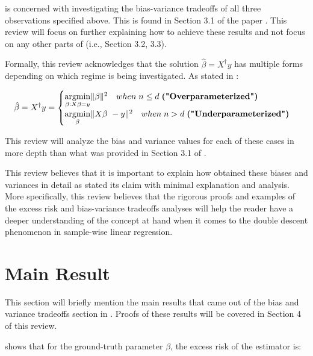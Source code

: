 \documentclass{article}
\begin{document}
\cite{Nakkiran_2019} is concerned with investigating the bias-variance tradeoffs of all three observations specified above. This is found in Section 3.1 of the paper \cite{Nakkiran_2019}. This review will focus on further explaining how to achieve these results and not focus on any other parts of \cite{Nakkiran_2019} (i.e., Section 3.2, 3.3).

Formally, this review acknowledges that the solution $\hat{\beta} = X^{\dagger}y$ has multiple forms depending on which regime is being investigated. As stated in \cite{Nakkiran_2019}:

\begin{equation*}
\hat{\beta} = X^{\dagger}y =\begin{cases}
          \underset{\beta : X\beta = y}{\mathrm{argmin}} \|\beta\|^2 \quad when \hspace{1mm} n\leq d \hspace{1mm} \textbf{("Overparameterized")}\\
          \underset{\beta}{\mathrm{argmin}} \|X\beta\ - y\|^2 \quad when \hspace{1mm} n>d \hspace{1mm} \textbf{("Underparameterized")}
     \end{cases}
\end{equation*}

This review will analyze the bias and variance values for each of these cases in more depth than what was provided in Section 3.1 of \cite{Nakkiran_2019}.

This review believes that it is important to explain how \cite{Nakkiran_2019} obtained these biases and variances in detail as \cite{Nakkiran_2019} stated its claim with minimal explanation and analysis. More specifically, this review believes that the rigorous proofs and examples of the excess risk and bias-variance tradeoffs analyses will help the reader have a deeper understanding of the concept at hand when it comes to the double descent phenomenon in sample-wise linear regression.

\section{Main Result}

This section will briefly mention the main results that came out of the bias and variance tradeoffs section in \cite{Nakkiran_2019}. Proofs of these results will be covered in Section 4 of this review.

\cite{Nakkiran_2019} shows that for the ground-truth parameter $\beta$, the excess risk of the estimator is:
\end{document}
